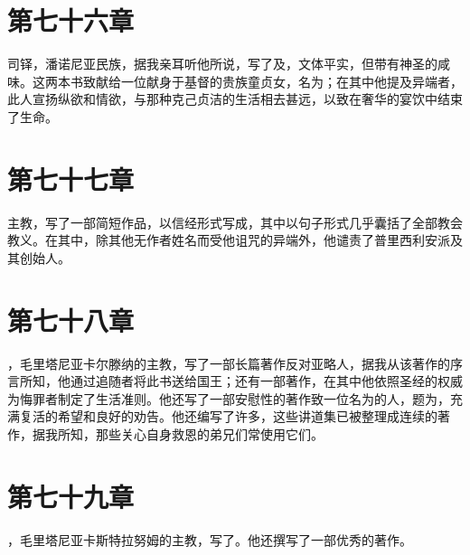 
\section{第七十六章}

司铎，潘诺尼亚民族，据我亲耳听他所说，写了及，文体平实，但带有神圣的咸味。这两本书致献给一位献身于基督的贵族童贞女，名为；在其中他提及异端者，此人宣扬纵欲和情欲，与那种克己贞洁的生活相去甚远，以致在奢华的宴饮中结束了生命。\par


\section{第七十七章}

主教，写了一部简短作品，以信经形式写成，其中以句子形式几乎囊括了全部教会教义。在其中，除其他无作者姓名而受他诅咒的异端外，他谴责了普里西利安派及其创始人。\par


\section{第七十八章}

，毛里塔尼亚卡尔滕纳的主教，写了一部长篇著作反对亚略人，据我从该著作的序言所知，他通过追随者将此书送给国王；还有一部著作，在其中他依照圣经的权威为悔罪者制定了生活准则。他还写了一部安慰性的著作致一位名为的人，题为，充满复活的希望和良好的劝告。他还编写了许多，这些讲道集已被整理成连续的著作，据我所知，那些关心自身救恩的弟兄们常使用它们。\par


\section{第七十九章}

，毛里塔尼亚卡斯特拉努姆的主教，写了。他还撰写了一部优秀的著作。\par

